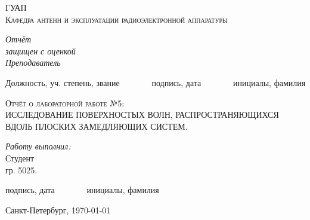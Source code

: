 \begin{titlepage}
\begin{center}
\textsc{\LARGE ГУАП}\\[2cm]
\textsc{\LARGE Кафедра антенн и эксплуатации радиоэлектронной 
 аппаратуры}
\\[1cm]


 \begin{flushleft} \large
  \emph{Отчёт} \\
   \emph{защищен с оценкой}
   \\[0.5cm]
   \emph{Преподаватель}\\[-4mm]
   \HRule
\end{flushleft}
\begin{flushright}
Должность, уч. степень, звание \ \ \ \ \ \ \ подпись, дата \ \ \ \ \ \ \ инициалы, фамилия \\[10mm]
\end{flushright}

\textsc{\Large Отчёт о лабораторной работе №5:} \\[1cm]
\textsc{\Large ИССЛЕДОВАНИЕ ПОВЕРХНОСТЫХ ВОЛН, РАСПРОСТРАНЯЮЩИХСЯ ВДОЛЬ ПЛОСКИХ ЗАМЕДЛЯЮЩИХ СИСТЕМ.}\\[1.5cm]


\begin{flushleft} \large
\emph{Работу выполнил:}\\
Студент\\ гр. 5025.\\[-4mm]
\HRule
\end{flushleft}
\begin{flushright}
подпись, дата \ \ \ \ \ \ \ инициалы, фамилия \\[10mm]
\end{flushright}

\vfill
Санкт-Петербург, {\today}
\end{center}
\end{titlepage}